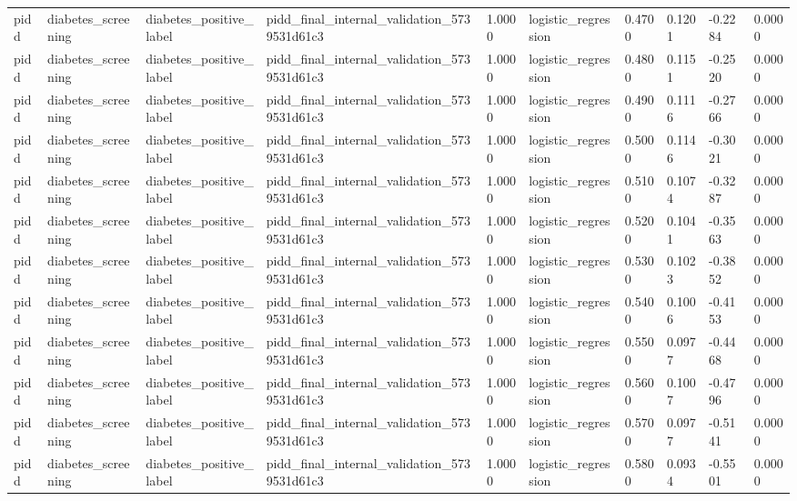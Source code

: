 \begin{tabular}{llllllllll}
pidd & diabetes\_screening & diabetes\_positive\_label & pidd\_final\_internal\_validation\_5739531d61c3 & 1.0000 & logistic\_regression & 0.4700 & 0.1201 & -0.2284 & 0.0000 \\
pidd & diabetes\_screening & diabetes\_positive\_label & pidd\_final\_internal\_validation\_5739531d61c3 & 1.0000 & logistic\_regression & 0.4800 & 0.1151 & -0.2520 & 0.0000 \\
pidd & diabetes\_screening & diabetes\_positive\_label & pidd\_final\_internal\_validation\_5739531d61c3 & 1.0000 & logistic\_regression & 0.4900 & 0.1116 & -0.2766 & 0.0000 \\
pidd & diabetes\_screening & diabetes\_positive\_label & pidd\_final\_internal\_validation\_5739531d61c3 & 1.0000 & logistic\_regression & 0.5000 & 0.1146 & -0.3021 & 0.0000 \\
pidd & diabetes\_screening & diabetes\_positive\_label & pidd\_final\_internal\_validation\_5739531d61c3 & 1.0000 & logistic\_regression & 0.5100 & 0.1074 & -0.3287 & 0.0000 \\
pidd & diabetes\_screening & diabetes\_positive\_label & pidd\_final\_internal\_validation\_5739531d61c3 & 1.0000 & logistic\_regression & 0.5200 & 0.1041 & -0.3563 & 0.0000 \\
pidd & diabetes\_screening & diabetes\_positive\_label & pidd\_final\_internal\_validation\_5739531d61c3 & 1.0000 & logistic\_regression & 0.5300 & 0.1023 & -0.3852 & 0.0000 \\
pidd & diabetes\_screening & diabetes\_positive\_label & pidd\_final\_internal\_validation\_5739531d61c3 & 1.0000 & logistic\_regression & 0.5400 & 0.1006 & -0.4153 & 0.0000 \\
pidd & diabetes\_screening & diabetes\_positive\_label & pidd\_final\_internal\_validation\_5739531d61c3 & 1.0000 & logistic\_regression & 0.5500 & 0.0977 & -0.4468 & 0.0000 \\
pidd & diabetes\_screening & diabetes\_positive\_label & pidd\_final\_internal\_validation\_5739531d61c3 & 1.0000 & logistic\_regression & 0.5600 & 0.1007 & -0.4796 & 0.0000 \\
pidd & diabetes\_screening & diabetes\_positive\_label & pidd\_final\_internal\_validation\_5739531d61c3 & 1.0000 & logistic\_regression & 0.5700 & 0.0977 & -0.5141 & 0.0000 \\
pidd & diabetes\_screening & diabetes\_positive\_label & pidd\_final\_internal\_validation\_5739531d61c3 & 1.0000 & logistic\_regression & 0.5800 & 0.0934 & -0.5501 & 0.0000 \\

\end{tabular}
